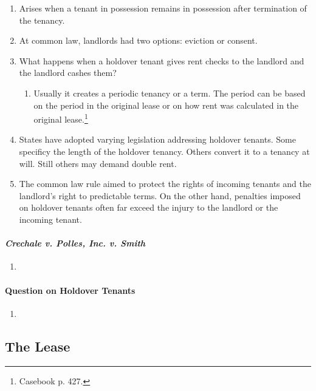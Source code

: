 \begin{enumerate}
    \item Arises when a tenant in possession remains in possession after 
    termination of the tenancy.
    \item At common law, landlords had two options: eviction or consent.
    \item What happens when a holdover tenant gives rent checks to the 
    landlord and the landlord cashes them?
    \begin{enumerate}
        \item Usually it creates a periodic tenancy or a term. The period can 
        be based on the period in the original lease or on how rent was 
        calculated in the original lease.\footnote{Casebook p. 427.}
    \end{enumerate}
    \item States have adopted varying legislation addressing holdover tenants. 
    Some specificy the length of the holdover tenancy. Others convert it to a 
    tenancy at will. Still others may demand double rent.
    \item The common law rule aimed to protect the rights of incoming tenants 
    and the landlord's right to predictable terms. On the other hand, 
    penalties imposed on holdover tenants often far exceed the injury to the 
    landlord or the incoming tenant.
\end{enumerate}

\paragraph{\emph{Crechale v. Polles, Inc. v. Smith}} %

\begin{enumerate}
    \item 
\end{enumerate}

\paragraph{Question on Holdover Tenants} %

\begin{enumerate}
    \item 
\end{enumerate}

\subsection{The Lease}

